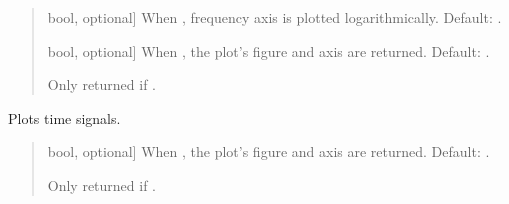 \documentclass[letterpaper,10pt,english]{sphinxmanual}
\begin{document}
\begin{fulllineitems}
\begin{fulllineitems}
\begin{quote}
\begin{description}
\begin{description}
\sphinxlineitem{\sphinxstylestrong{logfreqs}}{[}bool, optional{]}
\sphinxAtStartPar
When , frequency axis is plotted logarithmically.
Default: .

\sphinxlineitem{\sphinxstylestrong{returns}}{[}bool, optional{]}
\sphinxAtStartPar
When , the plot’s figure and axis are returned.
Default: .

\end{description}

\begin{description}
\sphinxAtStartPar
Only returned if .

\end{description}

\end{description}\end{quote}

\end{fulllineitems}


\begin{fulllineitems}
\label{\detokenize{classes:dsptools.classes.signal_class.Signal.plot_time}}
\pysigstartsignatures
{}
\pysigstopsignatures
\sphinxAtStartPar
Plots time signals.
\begin{quote}\begin{description}
\begin{description}
\sphinxlineitem{\sphinxstylestrong{returns}}{[}bool, optional{]}
\sphinxAtStartPar
When , the plot’s figure and axis are returned.
Default: .

\end{description}

\begin{description}
\sphinxAtStartPar
Only returned if .

\end{description}


\end{description}
\end{quote}
\end{fulllineitems}
\end{fulllineitems}
\end{document}
